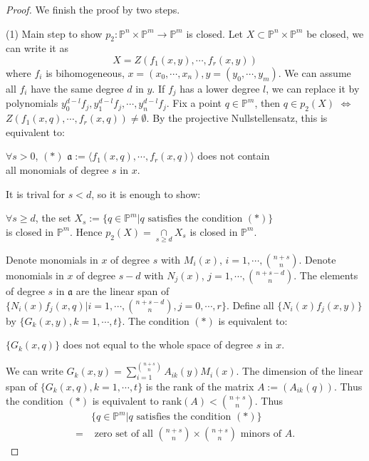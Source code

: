\begin{proof}
	We finish the proof by two steps.

	(1) Main step to show $ p_2:\mathbb{P}^n\times \mathbb{P}^m\to \mathbb{P}^m $ is closed. Let $ X\subset\mathbb{P}^n\times\mathbb{P}^m $ be closed, we can write it as
	$$
		X=Z(f_1(x,y),\cdots,f_r(x,y))
	$$
	where $ f_i $ is bihomogeneous, $ x=(x_0,\cdots,x_n),y=(y_0,\cdots,y_m) $. We can assume all $ f_i $ have the same degree $ d $ in $ y $. If $ f_j $ has a lower degree $ l $, we can replace it by polynomials $ y_0^{d-l}f_j,y_1^{d-l}f_j,\cdots,y_n^{d-l}f_j $. Fix a point $ q\in\mathbb{P}^m $, then $ q\in p_2(X) $ $ \Leftrightarrow $ $ Z(f_1(x,q),\cdots,f_r(x,q))\neq \emptyset $. By the projective Nullstellensatz, this is equivalent to:
	\begin{center}
		$ \forall s>0 $, $ (\ast) $ $ \mathfrak{a}:=\langle f_1(x,q),\cdots,f_r(x,q)\rangle $ does not contain\\
		all monomials of degree $ s $ in $ x $.
	\end{center}
	It is trival for $ s<d $, so it is enough to show:
	\begin{center}
		$ \forall s\geq d $, the set $X_s:= \{ q\in\mathbb{P}^m|q \text{ satisfies the condition } (\ast) \} $ \\
		is closed in $ \mathbb{P}^m $.
		Hence $ p_2(X)=\mathop{\cap}\limits_{s\geq d} X_s $ is closed in $ \mathbb{P}^m $.
	\end{center}
	Denote monomials in $ x $ of degree $ s $ with $ M_i(x) $, $ i=1,\cdots,\binom{n+s}{n} $. Denote monomials in $ x $ of degree $ s-d $ with $ N_j(x) $, $ j=1,\cdots,\binom{n+s-d}{n} $. The elements of degree $ s $ in $ \mathfrak{a} $ are the linear span of $ \{N_i(x)f_j(x,q)|i=1,\cdots,\binom{n+s-d}{n},j=0,\cdots,r\} $. Define all  $ \{N_i(x)f_j(x,y)\} $ by $ \{ G_k(x,y),k=1,\cdots,t \} $. The condition $ (\ast) $ is equivalent to:
	\begin{center}
		$ \{ G_k(x,q) \} $ does not equal to the whole space of degree $ s $ in $ x $.
	\end{center}
	We can write $ G_k(x,y)=\sum\limits_{i=1}^{\binom{n+s}{n}} A_{ik}(y)M_i(x) $. The dimension of the linear span of $ \{G_k(x,q),k=1,\cdots,t \}$ is the rank of the matrix $ A:=(A_{ik}(q)) $. Thus the condition $ (\ast) $ is equivalent to $ \text{rank}(A)<\binom{n+s}{n} $. Thus
	\begin{align*}
		  & \{q\in\mathbb{P}^m|q \text{ satisfies the condition } (\ast) \}                    \\
		= & \text{ zero set of all } \binom{n+s}{n}\times \binom{n+s}{n} \text{ minors of } A.

\end{align*}
\end{proof}

